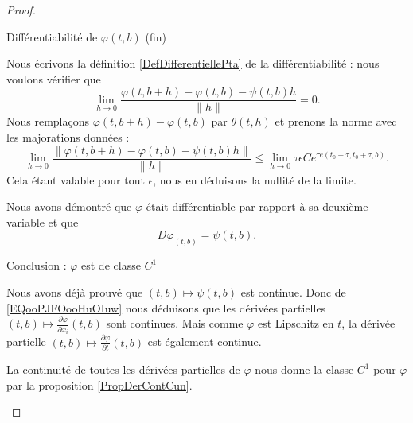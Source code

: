 \begin{proof}
\begin{subproof}
\begin{subproof}
        \item[Différentiabilité de \( \varphi(t,b)\) (fin)]

            Nous écrivons la définition \ref{DefDifferentiellePta} de la différentiabilité : nous voulons vérifier que
            \begin{equation}
                \lim_{h\to 0} \frac{ \varphi(t,b+h)-\varphi(t,b)-\psi(t,b)h }{ \| h \| }=0.
            \end{equation}
            Nous remplaçons \( \varphi(t,b+h)-\varphi(t,b)\) par \( \theta(t,h)\) et prenons la norme avec les majorations données :
            \begin{equation}
                \lim_{h\to 0} \frac{ \|  \varphi(t,b+h)-\varphi(t,b)-\psi(t,b)h  \|   }{ \| h \| }\leq \lim_{h\to 0} \tau\epsilon C e^{\tau e(t_0-\tau,t_0+\tau,b)}.
            \end{equation}
            Cela étant valable pour tout \( \epsilon\), nous en déduisons la nullité de la limite.

            Nous avons démontré que \( \varphi\) était différentiable par rapport à sa deuxième variable et que
            \begin{equation}        \label{EQooPJFOooHuOIuw}
                D\varphi_{(t,b)}=\psi(t,b).
            \end{equation}
            \end{subproof}
            
        \item[Conclusion : \( \varphi\) est de classe \( C^1\)]

            Nous avons déjà prouvé que \( (t,b)\mapsto \psi(t,b)\) est continue. Donc de \eqref{EQooPJFOooHuOIuw} nous déduisons que les dérivées partielles \(  (t,b)\mapsto\frac{ \partial \varphi }{ \partial x_i } (t,b)\) sont continues. Mais comme \( \varphi\) est Lipschitz en \( t\), la dérivée partielle \( (t,b)\mapsto \frac{ \partial \varphi }{ \partial t }(t,b)\) est également continue.

            La continuité de toutes les dérivées partielles de \( \varphi\) nous donne la classe \( C^1\) pour \( \varphi\) par la proposition \ref{PropDerContCun}.
    \end{subproof}
\end{proof}

